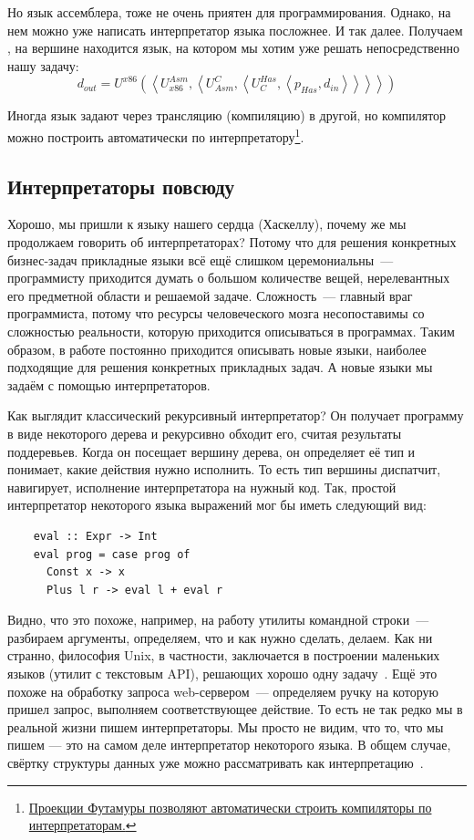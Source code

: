Но язык ассемблера, тоже не очень приятен для программирования.
Однако, на нем можно уже написать интерпретатор языка посложнее.
И так далее.
Получаем , на вершине находится язык, на котором мы хотим уже решать непосредственно нашу задачу:
\[
    d_{out} =
    U^{x86}\left(\left<
                     U_{x86}^{Asm}, \left<
                                        U^C_{Asm}, \left<
                                                       U^{Has}_C, \left< p_{Has}, d_{in}
                \right>\right>\right>\right>\right)
\]

Иногда язык задают через трансляцию (компиляцию) в другой, но компилятор можно построить автоматически по интерпретатору\footnote{\href{https://habr.com/ru/articles/47418/}{Проекции Футамуры позволяют автоматически строить компиляторы по интерпретаторам.}}.

\subsection{Интерпретаторы повсюду} \label{subsec:interpreters-everywhere}

Хорошо, мы пришли к языку нашего сердца (Хаскеллу), почему же мы продолжаем говорить об интерпретаторах?
Потому что для решения конкретных бизнес-задач прикладные языки всё ещё слишком церемониальны~--- программисту приходится думать о большом количестве вещей, нерелевантных его предметной области и решаемой задаче.
Сложность~--- главный враг программиста, потому что ресурсы человеческого мозга несопоставимы со сложностью реальности, которую приходится описываться в программах.
Таким образом, в работе постоянно приходится описывать новые языки, наиболее подходящие для решения конкретных прикладных задач.
А новые языки мы задаём с помощью интерпретаторов.

Как выглядит классический рекурсивный интерпретатор?
Он получает программу в виде некоторого дерева и рекурсивно обходит его, считая результаты поддеревьев.
Когда он посещает вершину дерева, он определяет её тип и понимает, какие действия нужно исполнить.
То есть тип вершины диспатчит, навигирует, исполнение интерпретатора на нужный код.
Так, простой интерпретатор некоторого языка выражений мог бы иметь следующий вид:
\begin{verbatim}
    eval :: Expr -> Int
    eval prog = case prog of
      Const x -> x
      Plus l r -> eval l + eval r
\end{verbatim}

Видно, что это похоже, например, на работу утилиты командной строки~--- разбираем аргументы, определяем, что и как нужно сделать, делаем.
Как ни странно, философия Unix, в частности, заключается в построении маленьких языков (утилит с текстовым API), решающих хорошо одну задачу~\cite{bentley1986little}.
Ещё это похоже на обработку запроса web-сервером~--- определяем ручку на которую пришел запрос, выполняем соответствующее действие.
То есть не так редко мы в реальной жизни пишем интерпретаторы.
Мы просто не видим, что то, что мы пишем --- это на самом деле интерпретатор некоторого языка.
В общем случае, свёртку структуры данных уже можно рассматривать как интерпретацию~\cite{gibbons2014folding}.

